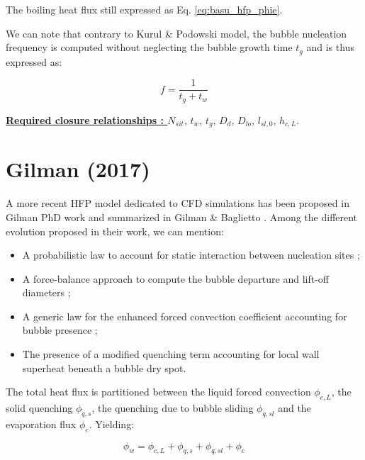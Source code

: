 The boiling heat flux still expressed as Eq. \ref{eq:basu_hfp_phie}.

\npar

\begin{remark*}{}
We can note that contrary to  Kurul \& Podowski model, the bubble nucleation frequency is computed without neglecting the bubble growth time $t_{g}$ and is thus expressed as:

\begin{equation}
f = \dfrac{1}{t_{g} + t_{w}}
\end{equation}
\end{remark*}

\textbf{\underline{Required closure relationships : }} $N_{sit}$, $t_{w}$, $t_{g}$, $D_{d}$, $D_{lo}$, $l_{sl,0}$, $h_{c,L}$. 



\section{Gilman (2017)}

A more recent HFP model dedicated to CFD simulations has been proposed in Gilman PhD work \cite{gilman_development_2014} and summarized in Gilman \& Baglietto \cite{gilman_self-consistent_2017}. Among the different evolution proposed in their work, we can mention:

\begin{itemize}
\item A probabilistic law to account for static interaction between nucleation sites ;
\item A force-balance approach to compute the bubble departure and lift-off diameters ;
\item A generic law for the enhanced forced convection coefficient accounting for bubble presence ; 
\item The presence of a modified quenching term accounting for local wall superheat beneath a bubble dry spot.
\end{itemize}

The total heat flux is partitioned between the liquid forced convection $\phi_{c,L}$, the solid quenching $\phi_{q,s}$, the quenching due to bubble sliding $\phi_{q,sl}$ and the evaporation flux $\phi_{e}$. Yielding:

\begin{equation}
\phi_{w} = \phi_{c,L} + \phi_{q,s} + \phi_{q,sl} + \phi_{e}
\label{eq:gilman_hfp_phiw}
\end{equation} 

